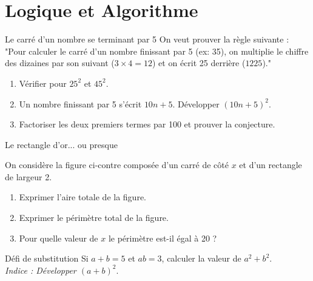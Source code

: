 \documentclass[a4paper]{book}
\begin{document}
    \section{Logique et Algorithme}

    \begin{exerciceTitre}{Le carré d'un nombre se terminant par 5}
        On veut prouver la règle suivante : "Pour calculer le carré d'un nombre finissant par 5 (ex: 35), on multiplie le chiffre des dizaines par son suivant ($3 \times 4 = 12$) et on écrit 25 derrière ($1225$)."
        \begin{enumerate}
            \item Vérifier pour $25^2$ et $45^2$.
            \item Un nombre finissant par 5 s'écrit $10n + 5$. Développer $(10n+5)^2$.
            \item Factoriser les deux premiers termes par 100 et prouver la conjecture.
        \end{enumerate}
    \end{exerciceTitre}
    
    \begin{exerciceTitre}{Le rectangle d'or... ou presque}
        \begin{minipage}{0.65\linewidth}
            On considère la figure ci-contre composée d'un carré de côté $x$ et d'un rectangle de largeur 2.
            \begin{enumerate}
                \item Exprimer l'aire totale de la figure.
                \item Exprimer le périmètre total de la figure.
                \item Pour quelle valeur de $x$ le périmètre est-il égal à 20 ?
            \end{enumerate}
        \end{minipage}
        \hfill
        \begin{minipage}{0.3\linewidth}
        \end{minipage}
    \end{exerciceTitre}
    
    \begin{exerciceTitre}{Défi de substitution}
        Si $a + b = 5$ et $ab = 3$, calculer la valeur de $a^2 + b^2$. \\
        \textit{Indice : Développer $(a+b)^2$}.
    \end{exerciceTitre}
    
\end{document}
